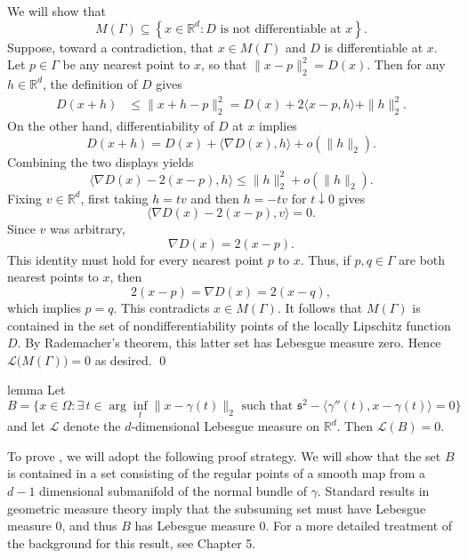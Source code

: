 \documentclass[11pt]{article}
\begin{document}
\begin{appendices}
We will show that
\[
    M(\Gamma)
    \subseteq
    \left\{x\in\mathbb{R}^d:D\text{ is not differentiable at }x\right\}.
\]
Suppose, toward a contradiction, that $x\in M(\Gamma)$ and $D$ is differentiable at $x$. Let $p\in\Gamma$ be any nearest point to $x$, so that $\|x-p\|_2^2=D(x).$ Then for any $h\in\mathbb{R}^d$, the definition of $D$ gives
\begin{align*}
    D(x+h)
    &\leq
    \|x+h-p\|_2^2 =
    D(x)+2\langle x-p,h\rangle+\|h\|_2^2.
\end{align*}
On the other hand, differentiability of $D$ at $x$ implies
\[
    D(x+h)
    =
    D(x)+\langle\nabla D(x),h\rangle+o(\|h\|_2).
\]
Combining the two displays yields
\[
    \langle\nabla D(x)-2(x-p),h\rangle
    \leq
    \|h\|_2^2+o(\|h\|_2).
\]
Fixing $v\in\mathbb{R}^d$, first taking $h=tv$ and then $h=-tv$ for $t\downarrow0$ gives
\[
    \langle\nabla D(x)-2(x-p),v\rangle=0.
\]
Since $v$ was arbitrary,
\[
    \nabla D(x)=2(x-p).
\]
This identity must hold for every nearest point $p$ to $x$. Thus, if $p,q\in\Gamma$ are both nearest points to $x$, then
\[
    2(x-p)=\nabla D(x)=2(x-q),
\]
which implies $p=q$. This contradicts $x\in M(\Gamma)$. It follows that $M(\Gamma)$ is contained in the set of nondifferentiability points of the locally Lipschitz function $D$. By Rademacher's theorem, this latter set has Lebesgue measure zero. Hence $\mathcal{L}\big(M(\Gamma)\big)=0$ as desired.
\qed{}

\begin{restatable}{lemma}{} \label{lemma: IFT degen}
    Let
    \begin{equation} 
    B= \{x \in \Omega : \exists \,t \in \arg\inf_t \|x-\gamma(t)\|_2 \text{ such that } \mathfrak s^2 - \langle\gamma''(t), x-\gamma(t)\rangle = 0 \} \label{eq: ift degeneracy set}
    \end{equation}
    and let $\mathcal{L}$ denote the $d$-dimensional Lebesgue measure on $\mathbb{R}^d$. Then $\mathcal{L}(B) = 0.$
\end{restatable}
\noindent To prove , we will adopt the following proof strategy. We will show that the set $B$ is contained in a set consisting of the regular points of a smooth map from a $d-1$ dimensional submanifold of the normal bundle of $\gamma$. Standard results in geometric measure theory imply that the subsuming set must have Lebesgue measure $0$, and thus $B$ has Lebesgue measure $0$. For a more detailed treatment of the background for this result, see \citet{lee2003smooth} Chapter 5. 


\end{appendices}
\end{document}
